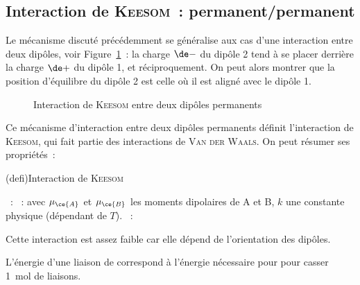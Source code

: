 \documentclass[../../main/main.tex]{subfiles}
\begin{document}
\subsection{Interaction de \textsc{Keesom}~: permanent/permanent}

Le mécanisme discuté précédemment se généralise aux cas d'une interaction entre
deux dipôles, voir Figure~\ref{fig:keesom}~: la charge $\de-$ du dipôle 2 tend à
se placer derrière la charge $\de+$ du dipôle 1, et réciproquement. On peut
alors montrer que la position d'équilibre du dipôle 2 est celle où il est aligné
avec le dipôle 1.

\begin{figure}[H]
	\centering
	\caption{Interaction de \textsc{Keesom} entre deux dipôles permanents}
	\label{fig:keesom}
\end{figure}

Ce mécanisme d'interaction entre deux dipôles permanents définit l'interaction
de \textsc{Keesom,} qui fait partie des interactions de \textsc{Van der Waals}.
On peut résumer ses propriétés~:
\begin{tcb*}[breakable](defi){Interaction de \textsc{Keesom}}
	\begin{itemize}[label=$\diamond$]
		~: 
		~:
		\psw{
			\[\Ec_p = -k \frac{\mu_{\ce{A}}{}^2\mu_{\ce{B}}{}^2}{d^6}\]
		}
		avec $\mu_{\ce{A}}$ et $\mu_{\ce{B}}$ les moments dipolaires de A et B, $k$
		une constante physique (dépendant de $T$).
		~:
	\end{itemize}
	Cette interaction est assez faible car elle dépend de l'orientation des dipôles.
\end{tcb*}


L'énergie d'une liaison de correspond à l'énergie nécessaire pour pour casser
\SI{1}{mol} de liaisons.
\end{document}

